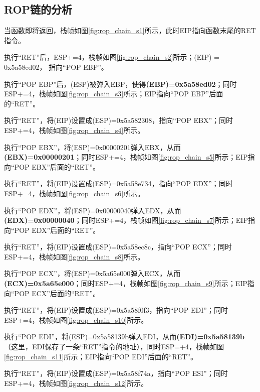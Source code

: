 \documentclass[bachelor]{thesis-uestc}
\begin{document}
\subsection{ROP链的分析}
当函数即将返回，栈帧如图\ref{fig:rop_chain_s1}所示，此时EIP指向函数末尾的RET指令。\par

执行``RET''后，ESP+=4，栈帧如图\ref{fig:rop_chain_s2}所示；(EIP) = 0x5a58ed02， 指向``POP EBP''。\par

执行``POP EBP''后，(ESP)被弹入EBP，使得\textbf{(EBP)=0x5a58ed02}；同时ESP+=4，栈帧如图\ref{fig:rop_chain_s3}所示；EIP指向``POP EBP''后面的``RET''。\par

执行``RET''，将(EIP)设置成(ESP)=0x5a582308，指向``POP EBX''；同时ESP+=4，栈帧如图\ref{fig:rop_chain_s4}所示。\par

执行``POP EBX''，将(ESP)=0x00000201弹入EBX，从而\textbf{(EBX)=0x00000201}；同时ESP+=4，栈帧如图\ref{fig:rop_chain_s5}所示；EIP指向``POP EBX''后面的``RET''。\par

执行``RET''，将(EIP)设置成(ESP)=0x5a58e734，指向``POP EDX''；同时ESP+=4，栈帧如图\ref{fig:rop_chain_s6}所示。\par

执行``POP EDX''，将(ESP)=0x00000040弹入EDX，从而\textbf{(EDX)=0x00000040}；同时ESP+=4，栈帧如图\ref{fig:rop_chain_s7}所示；EIP指向``POP EDX''后面的``RET''。\par

执行``RET''，将(EIP)设置成(ESP)=0x5a58ec8c，指向``POP ECX''；同时ESP+=4，栈帧如图\ref{fig:rop_chain_s8}所示。\par

执行``POP ECX''，将(ESP)=0x5a65e000弹入ECX，从而\textbf{(ECX)=0x5a65e000}；同时ESP+=4，栈帧如图\ref{fig:rop_chain_s9}所示；EIP指向``POP ECX''后面的``RET''。\par

执行``RET''，将(EIP)设置成(ESP)=0x5a58f0f3，指向``POP EDI''；同时ESP+=4，栈帧如图\ref{fig:rop_chain_s10}所示。\par

执行``POP EDI''，将(ESP)=0x5a58139b弹入EDI，从而\textbf{(EDI)=0x5a58139b}（这里，EDI保存了一条``RET''指令的地址），同时ESP=+4，栈帧如图\ref{fig:rop_chain_s11}所示；EIP指向``POP EDI''后面的``RET''。\par

执行``RET''，将(EIP)设置成(ESP)=0x5a58f74a，指向``POP ESI''；同时ESP+=4，栈帧如图\ref{fig:rop_chain_s12}所示。\par
\end{document}
